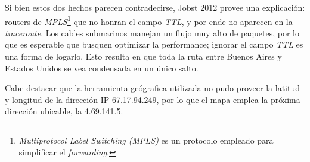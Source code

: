 \par Si bien estos dos hechos parecen contradecirse, Jobst 2012\cite{anomalias} provee una explicación: routers de \textit{MPLS}\footnote{\textit{Multiprotocol Label Switching (MPLS)} es un protocolo empleado para simplificar el \textit{forwarding}.} que no honran el campo \textit{TTL}, y por ende no aparecen en la \textit{traceroute}.
Los cables submarinos manejan un flujo muy alto de paquetes, por lo que es esperable que busquen optimizar la performance; ignorar el campo \textit{TTL} es una forma de logarlo.
Esto resulta en que toda la ruta entre Buenos Aires y Estados Unidos se vea condensada en un único salto.

\par Cabe destacar que la herramienta geógrafica utilizada no pudo proveer la latitud y longitud de la dirección IP 67.17.94.249, por lo que el mapa emplea la próxima dirección ubicable, la 4.69.141.5.
